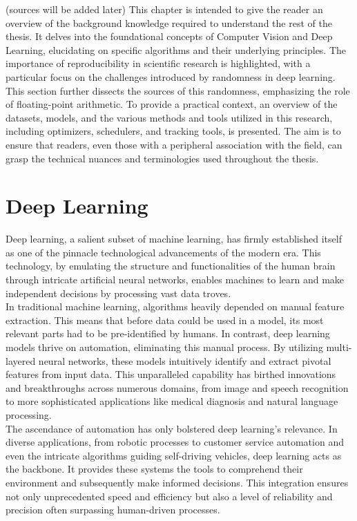 

(sources will be added later)
This chapter is intended to give the reader an overview of the background knowledge required to understand the rest of the thesis. 
It delves into the foundational concepts of Computer Vision and Deep Learning, elucidating on specific algorithms
and their underlying principles. The importance of reproducibility in scientific research is highlighted, with a particular focus 
on the challenges introduced by randomness in deep learning. This section further dissects the sources of this randomness, 
emphasizing the role of floating-point arithmetic. To provide a practical context, an overview of the datasets, models, and 
the various methods and tools utilized in this research, including optimizers, schedulers, and tracking tools, is presented. 
The aim is to ensure that readers, even those with a peripheral association with the field, can grasp the technical nuances and 
terminologies used throughout the thesis.
\section{Deep Learning}
Deep learning, a salient subset of machine learning, has firmly established itself as one of the pinnacle technological advancements of the modern era. 
This technology, by emulating the structure and functionalities of the human brain through intricate artificial neural networks, enables machines to 
learn and make independent decisions by processing vast data troves.\\

In traditional machine learning, algorithms heavily depended on manual feature extraction. 
This means that before data could be used in a model, its most relevant parts had to be 
pre-identified by humans. In contrast, deep learning models thrive on automation, eliminating 
this manual process. By utilizing multi-layered neural networks, these models intuitively 
identify and extract pivotal features from input data. This unparalleled capability has 
birthed innovations and breakthroughs across numerous domains, from image and speech 
recognition to more sophisticated applications like medical diagnosis and natural language 
processing.\\

The ascendance of automation has only bolstered deep learning's relevance. 
In diverse applications, from robotic processes to customer service automation 
and even the intricate algorithms guiding self-driving vehicles, deep learning 
acts as the backbone. It provides these systems the tools to comprehend their 
environment and subsequently make informed decisions. This integration ensures 
not only unprecedented speed and efficiency but also a level of reliability and 
precision often surpassing human-driven processes.\\

